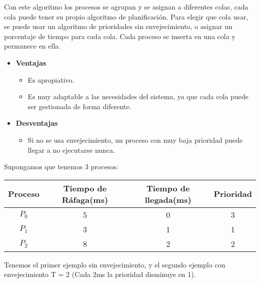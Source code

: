 \documentclass{article}
\begin{document}
Con este algoritmo los procesos se agrupan y se asignan a diferentes colas,
cada cola puede tener su propio algoritmo de planificación. Para elegir que cola usar,
se puede usar un algoritmo de prioridades sin envejecimiento, o asignar un porcentaje
de tiempo para cada cola.
Cada proceso se inserta en una cola y permanece en ella.
\begin{itemize}
	\item \textbf{Ventajas}
	\begin{itemize}
		\item Es apropiativo.
		\item Es muy adaptable a las necesidades del sistema, ya que cada cola puede ser gestionada de
		forma diferente.

	\end{itemize}
	
	\item \textbf{Desventajas}
	\begin{itemize}
		\item Si no se usa envejecimiento, un proceso con muy baja prioridad puede llegar
		a no ejecutarse nunca.
	\end{itemize}
\end{itemize}

Supongamos que tenemos 3 procesos:
\begin{center}
	\begin{tabular}{|c|c|c|c|} \hline
		Proceso & Tiempo de Ráfaga(ms) & Tiempo de llegada(ms) & Prioridad \\ \hline
		$P_{0}$ & 5 & 0 & 3 \\ 
		$P_{1}$ & 3 & 1 & 1 \\ 
		$P_{2}$ & 8 & 2 & 2 \\ \hline
	\end{tabular}
\end{center}

Tenemos el primer ejemplo sin envejecimiento, y el segundo ejemplo con 
envejecimiento T = 2 (Cada 2ms la prioridad disminuye en 1).

\vspace{0.4cm}
\end{document}
